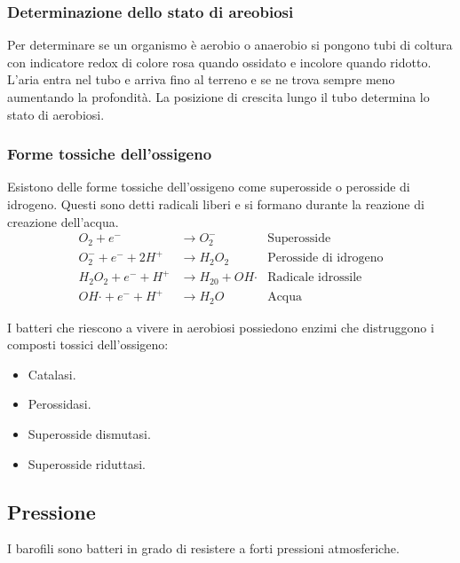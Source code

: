 		\subsubsection{Determinazione dello stato di areobiosi}
		Per determinare se un organismo \`e aerobio o anaerobio si pongono tubi di coltura con indicatore redox di colore rosa quando ossidato e incolore quando ridotto.
		L'aria entra nel tubo e arriva fino al terreno e se ne trova sempre meno aumentando la profondit\`a.
		La posizione di crescita lungo il tubo determina lo stato di aerobiosi.

		\subsubsection{Forme tossiche dell'ossigeno}
		Esistono delle forme tossiche dell'ossigeno come superosside o perosside di idrogeno.
		Questi sono detti radicali liberi e si formano durante la reazione di creazione dell'acqua.
		\begin{align*}
			O_2 + e^- &\rightarrow O_2^- &\text{Superosside}\\
			O_2^- + e^- + 2H^+ &\rightarrow H_2O_2 &\text{Perosside di idrogeno}\\
			H_2O_2 + e^- + H^+ &\rightarrow H_20 + OH\mathbf{\cdot} &\text{Radicale idrossile}\\
			OH\mathbf{\cdot} + e^- + H^+ &\rightarrow H_2O &\text{Acqua}
		\end{align*}

		I batteri che riescono a vivere in aerobiosi possiedono enzimi che distruggono i composti tossici dell'ossigeno:
		\begin{multicols}{2}
			\begin{itemize}
				\item Catalasi.
				\item Perossidasi.
				\item Superosside dismutasi.
				\item Superosside riduttasi.
			\end{itemize}
		\end{multicols}

	\subsection{Pressione}
	I barofili sono batteri in grado di resistere a forti pressioni atmosferiche.

